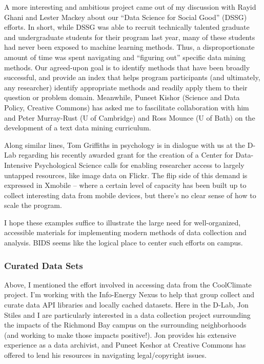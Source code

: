 A more interesting and ambitious project came out of my discussion with Rayid
Ghani and Lester Mackey about our “Data Science for Social Good” (DSSG) efforts.
In short, while DSSG was able to recruit technically talented graduate and
undergraduate students for their program last year, many of these students had
never been exposed to machine learning methods. Thus, a disproportionate amount
of time was spent navigating and “figuring out” specific data mining methods.
Our agreed-upon goal is to identify methods that have been broadly successful,
and provide an index that helps program participants (and ultimately, any
researcher) identify appropriate methods and readily apply them to their
question or problem domain. Meanwhile, Puneet Kishor (Science and Data Policy,
Creative Commons) has asked me to fascilitate collaboration with him and Peter
Murray-Rust (U of Cambridge) and Ross Mounce (U of Bath) on the development of a
text data mining curriculum.

Along similar lines, Tom Griffiths in psychology is in dialogue with us at the
D-Lab regarding his recently awarded grant for the creation of a Center for
Data-Intensive Psychological Science calls for enabling researcher access to
largely untapped resources, like image data on Flickr.  The flip side of this
demand is expressed in Xmobile -- where a certain level of capacity has been
built up to collect interesting data from mobile devices, but there's no clear
sense of how to scale the program.

I hope these examples suffice to illustrate the large need for well-organized,
accessible materials for implementing modern methods of data collection and
analysis. BIDS seems like the logical place to center such efforts on campus.

\subsubsection*{Curated Data Sets}

Above, I mentioned the effort involved in accessing data from the CoolClimate
project. I'm working with the Info-Energy Nexus to help that group collect and
curate data API libraries and locally cached datasets. Here in the D-Lab, Jon
Stiles and I are particularly interested in a data collection project
surrounding the impacts of the Richmond Bay campus on the surrounding
neighborhoods (and working to make those impacts positive!). Jon provides his
extensive experience as a data archivist, and Puneet Keshor at Creative Commons
has offered to lend his resources in navigating legal/copyright issues.

